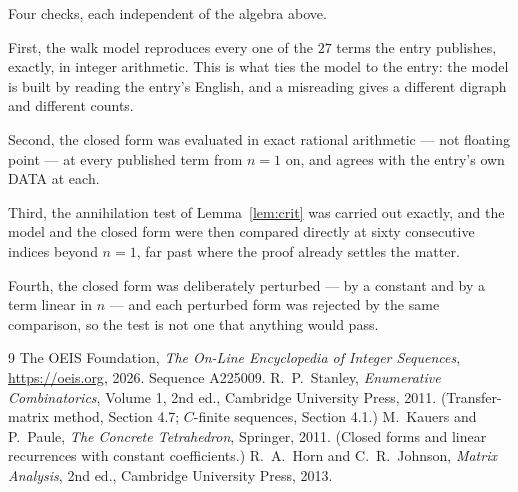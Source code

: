 \documentclass[11pt,a4paper]{article}
\theoremstyle{plain}
\theoremstyle{definition}
\begin{document}
Four checks, each independent of the algebra above.

First, the walk model reproduces every one of the $27$ terms the entry publishes,
exactly, in integer arithmetic. This is what ties the model to the entry: the model is built
by reading the entry's English, and a misreading gives a different digraph and different
counts.

Second, the closed form was evaluated in exact rational arithmetic --- not floating point ---
at every published term from $n=1$ on, and agrees with the entry's own DATA at each.

Third, the annihilation test of Lemma~\ref{lem:crit} was carried out exactly, and the model
and the closed form were then compared directly at sixty consecutive indices beyond
$n=1$, far past where the proof already settles the matter.

Fourth, the closed form was deliberately perturbed --- by a constant and by a term linear in
$n$ --- and each perturbed form was rejected by the same comparison, so the test is not one
that anything would pass.

\begin{thebibliography}{9}
 The OEIS Foundation, \emph{The On-Line Encyclopedia of Integer
Sequences}, \url{https://oeis.org}, 2026. Sequence A225009.
 R.~P.~Stanley, \emph{Enumerative Combinatorics}, Volume 1, 2nd ed.,
Cambridge University Press, 2011. (Transfer-matrix method, Section 4.7; $C$-finite sequences,
Section 4.1.)
 M.~Kauers and P.~Paule, \emph{The Concrete Tetrahedron}, Springer, 2011.
(Closed forms and linear recurrences with constant coefficients.)
 R.~A.~Horn and C.~R.~Johnson, \emph{Matrix Analysis}, 2nd ed., Cambridge
University Press, 2013.
\end{thebibliography}
\end{document}
